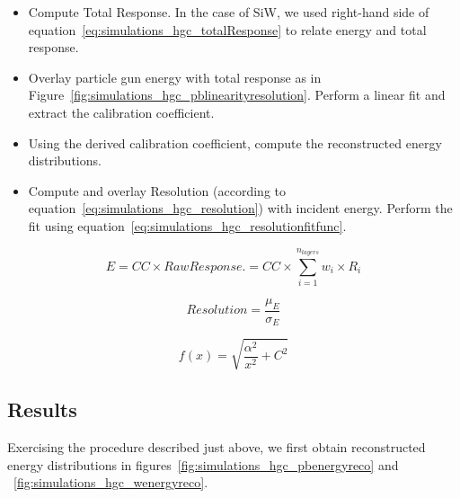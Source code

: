 \begin{itemize}
    \item Compute Total Response. In the case of SiW, we used right-hand side of equation~\ref{eq:simulations_hgc_totalResponse} to relate energy and total response.
    \item Overlay particle gun energy with total response as in Figure~\ref{fig:simulations_hgc_pblinearityresolution}. Perform a linear fit and extract the calibration coefficient.
    \item Using the derived calibration coefficient, compute the reconstructed energy distributions.
    \item Compute and overlay Resolution (according to equation~\ref{eq:simulations_hgc_resolution}) with incident energy. Perform the fit using equation~\ref{eq:simulations_hgc_resolutionfitfunc}.
\end{itemize}

\begin{center}
    \begin{equation}
        \label{eq:simulations_hgc_totalResponse}
         {E} = {CC} \times {Raw Response}. = {CC} \times {\sum_{i=1}^{n_{layers}} w_i \times  R_{i}}
    \end{equation}
\end{center}{}

\begin{center}
    \begin{equation}
        \label{eq:simulations_hgc_resolution}
         {Resolution} = {\frac{\mu_E}{\sigma_E}}
    \end{equation}
\end{center}

\begin{center}
    \begin{equation}
        \label{eq:simulations_hgc_resolutionfitfunc}
         {f(x)} = {\sqrt{\frac{\alpha^2}{x^2} + C^2}}
    \end{equation}
\end{center}

\subsection{Results}
Exercising the procedure described just above, we first obtain reconstructed energy distributions in figures~\ref{fig:simulations_hgc_pbenergyreco} and ~\ref{fig:simulations_hgc_wenergyreco}.

